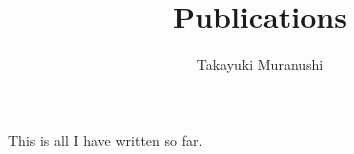 \documentclass{article}
\title{Publications}
\author{Takayuki Muranushi}
\begin{document}
\maketitle

\begin{bibunit}[custom2]
  This is all I have written so far.

  \nocite{*}

  \renewcommand\refname{Peer-reviewed Publications}
  \putbib[publications]
\end{bibunit}
\end{document}

